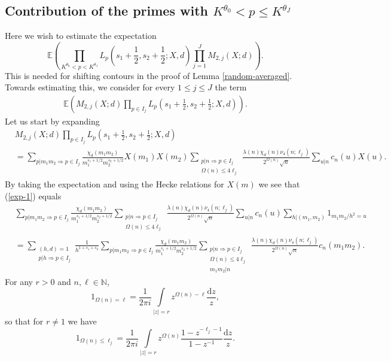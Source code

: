 \documentclass[a4paper,10pt,twoside]{amsart}
\theoremstyle{definition}
\numberwithin{equation}{section}
\renewcommand\:{\colon}
\begin{document}
\subsection{Contribution of the primes with $K^{\theta_0}<p\leq K^{\theta_J}$}

Here we wish to estimate the expectation
\[ 
\mathbb E\left(\prod_{K^{\theta_0}<p<K^{\theta_J}}L_p\left(s_1+\frac12,s_2+\frac12;X,d\right)\prod_{j=1}^J M_{2,j}(X;d)\right).\]
This is needed for shifting contours in the proof of Lemma \ref{random-averaged}. Towards estimating this, we consider for every $1\leq j\leq J$ the term 
\begin{align}\label{exp-1}
\mathbb E\left(M_{2,j}(X;d)\prod_{p\in I_j}L_p\left(s_1+\frac12,s_2+\frac12;X,d\right)\right).
\end{align}
Let us start by expanding
\begin{align*}
&M_{2,j}(X;d)\prod_{p\in I_j}L_p\left(s_1+\frac12,s_2+\frac12;X,d\right)\\
&=\sum_{p|m_1m_2\Rightarrow p\in I_j}\frac{\chi_d(m_1m_2)}{m_1^{s_1+1/2}m_2^{s_2+1/2}}X(m_1)X(m_2)\sum_{\substack{p|n\Rightarrow p\in I_j\\
\Omega(n)\leq 4\ell_j}}\frac{\lambda(n)\chi_d(n)\nu_4(n;\ell_j)}{2^{\Omega(n)}\sqrt n}\sum_{u|n}c_n(u)X(u). 
\end{align*}
By taking the expectation and using the Hecke relations for $X(m)$ we see that (\ref{exp-1}) equals 
\begin{align}\label{after-exp}
&\sum_{p|m_1m_2\Rightarrow p\in I_j}\frac{\chi_d(m_1m_2)}{m_1^{s_1+1/2}m_2^{s_2+1/2}}\sum_{\substack{p|n\Rightarrow p\in I_j\\
\Omega(n)\leq 4\ell_j}}\frac{\lambda(n)\chi_d(n)\nu_4(n;\ell_j)}{2^{\Omega(n)}\sqrt n}\sum_{u|n}c_n(u)\sum_{h|(m_1,m_2)}1_{m_1m_2/h^2=u}\nonumber\\
&=\sum_{\substack{(h,d)=1\\
p|h\Rightarrow p\in I_j}}\frac1{h^{1+s_1+s_2}}\sum_{p|m_1m_2\Rightarrow p\in I_j}\frac{\chi_d(m_1m_2)}{m_1^{s_1+1/2}m_2^{s_2+1/2}}\sum_{\substack{p|n\Rightarrow p\in I_j\\
\Omega(n)\leq 4\ell_j\\
m_1m_2|n}}\frac{\lambda(n)\chi_d(n)\nu_4(n;\ell_j)}{2^{\Omega(n)}\sqrt n}c_n(m_1m_2).
\end{align}
For any $r>0$ and $n,\ell\in\mathbb N$,
\[ 
1_{\Omega(n)=\ell}=\frac1{2\pi i}\int\limits_{|z|=r}z^{\Omega(n)-\ell}\frac{\mathrm d z}z,\]
so that for $r\neq 1$ we have
\[ 
1_{\Omega(n)\leq\ell_j}=\frac1{2\pi i}\int\limits_{|z|=r}z^{\Omega(n)}\frac{1-z^{-\ell_j-1}}{1-z^{-1}}\frac{\mathrm d z}z.\]
\end{document}
